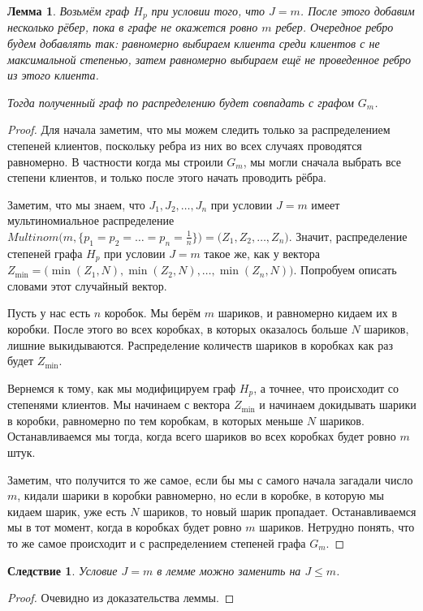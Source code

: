 \documentclass{matmex-diploma-custom}
\newcommand{\leqs}{\leqslant}
\newtheorem{cons}{Следствие}
\newtheorem{lemma}{Лемма}
\theoremstyle{named}
\begin{document}
\begin{lemma} \label{l2}
Возьмём граф $H_p$ при условии того, что $J = m$. 
После этого добавим несколько рёбер, пока в графе не окажется ровно $m$ ребер. 
Очередное ребро будем добавлять так: равномерно выбираем клиента среди клиентов с не максимальной степенью, 
затем равномерно выбираем ещё не проведенное ребро из этого клиента.

Тогда полученный граф по распределению будет совпадать с графом $G_m$.
\end{lemma}
\begin{proof}
Для начала заметим, что мы можем следить только за распределением степеней клиентов, 
поскольку ребра из них во всех случаях проводятся равномерно. В частности когда мы строили $G_m$, 
мы могли сначала выбрать все степени клиентов, и только после этого начать проводить рёбра.

Заметим, что мы знаем, что $J_1, J_2, \dots, J_n$ при условии $J = m$ имеет мультиномиальное распределение 
$Multinom\big(m, \{p_1=p_2= \dots = p_n = \frac{1}{n} \}\big) = \big(Z_1, Z_2, \dots, Z_n\big)$. 
Значит, распределение степеней графа $H_p$ при условии $J = m$ такое же,
как у вектора $Z_{\min} = \big(\min(Z_1, N), \min(Z_2, N), \dots, \min(Z_n, N)\big)$.
Попробуем описать словами этот случайный вектор.

Пусть у нас есть $n$ коробок. Мы берём $m$ шариков, и равномерно кидаем их в коробки. 
После этого во всех коробках, в которых оказалось больше $N$ шариков, лишние выкидываются.
Распределение количеств шариков в коробках как раз будет $Z_{\min}$. 

Вернемся к тому, как мы модифицируем граф $H_p$, а точнее, что происходит со степенями клиентов. 
Мы начинаем с вектора $Z_{\min}$ и начинаем докидывать шарики в коробки, 
равномерно по тем коробкам, в которых меньше $N$ шариков. 
Останавливаемся мы тогда, когда всего шариков во всех коробках будет ровно $m$ штук.

Заметим, что получится то же самое, если бы мы с самого начала загадали число $m$, кидали шарики в коробки равномерно, 
но если в коробке, в которую мы кидаем шарик, уже есть $N$ шариков, то новый шарик пропадает. 
Останавливаемся мы в тот момент, когда в коробках будет ровно $m$ шариков. 
Нетрудно понять, что то же самое происходит и с распределением степеней графа $G_m$.
\end{proof}

\smallskip

\begin{cons} \label{cons_1}
Условие $J = m$ в лемме можно заменить на $J \leqs m$.
\end{cons}
\begin{proof}
Очевидно из доказательства леммы.
\end{proof}
\end{document}
